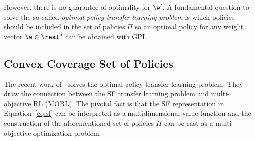 However, there is no guarantee of optimality for $\w'$.
A fundamental question to solve the so-called \textit{optimal policy transfer learning problem} is which policies should be included in the set of policies $\Pi$ so an optimal policy for any weight vector $\w\in\real^d$ can be obtained with GPI. 

\subsection*{Convex Coverage Set of Policies}

%     
%     

The recent work of~\citet{Alegre2022} solves the optimal policy transfer learning problem. They draw the connection between the SF transfer learning problem and multi-objective RL (MORL). The pivotal fact is that the SF representation in Equation~\eqref{eq:sf} can be interpreted as a multidimensional value function and the construction of the aforementioned set of policies $\Pi$ can be cast as a multi-objective optimization problem.
 
